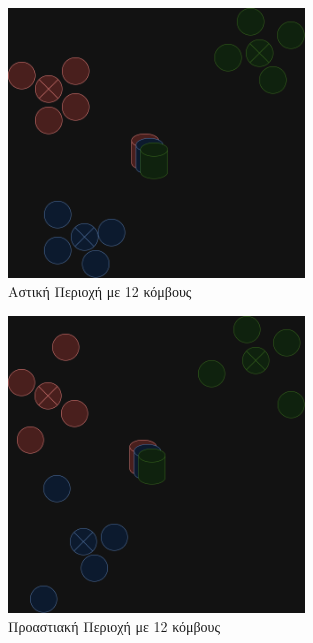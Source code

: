 \begin{figure}[H]
    \centering
    \includegraphics[width=0.7\textwidth]{figures/chapter1/urban.drawio.png}
    \caption{Αστική Περιοχή με 12 κόμβους}
    \label{fig47}
\end{figure}

\begin{figure}[H]
    \centering
    \includegraphics[width=0.7\textwidth]{figures/chapter1/suburban.drawio.png}
    \caption{Προαστιακή Περιοχή με 12 κόμβους}
    \label{fig48}
\end{figure}

\newpage


